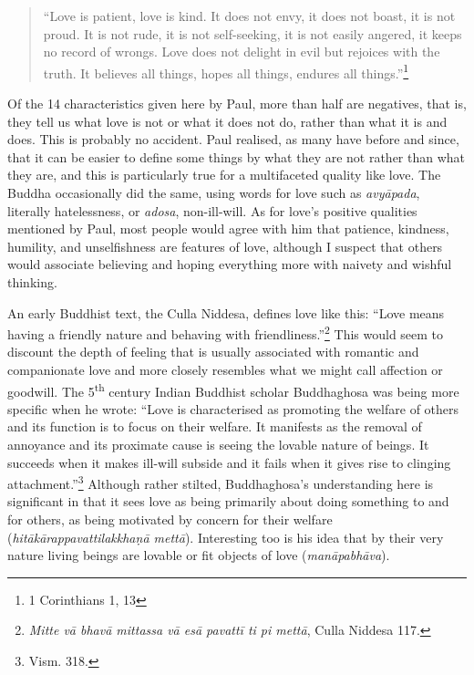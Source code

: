 \documentclass[10pt, openright]{book}
\begin{document}
\begin{quote}


“Love is patient, love is kind. It does not envy, it does not boast, it is not proud. It is not rude, it is not self-seeking, it is not easily angered, it keeps no record of wrongs. Love does not delight in evil but rejoices with the truth. It believes all things, hopes all things, endures all things.”\footnote {1 Corinthians 1, 13}




\end{quote}
Of the 14 characteristics given here by Paul, more than half are negatives, that is, they tell us what love is not or what it does not do, rather than what it is and does. This is probably no accident. Paul realised, as many have before and since, that it can be easier to define some things by what they are not rather than what they are, and this is particularly true for a multifaceted quality like love. The Buddha occasionally did the same, using words for love such as \textit{avyāpada}, literally hatelessness, or \textit{adosa}, non-ill-will. As for love’s positive qualities mentioned by Paul, most people would agree with him that patience, kindness, humility, and unselfishness are features of love, although I suspect that others would associate believing and hoping everything more with naivety and wishful thinking.


An early Buddhist text, the Culla Niddesa, defines love like this: “Love means having a friendly nature and behaving with friendliness.”\footnote {\textit{Mitte vā bhavā mittassa vā esā pavattī ti pi mettā}, Culla Niddesa 117.} This would seem to discount the depth of feeling that is usually associated with romantic and companionate love and more closely resembles what we might call affection or goodwill. The 5\textsuperscript{th} century Indian Buddhist scholar Buddhaghosa was being more specific when he wrote: “Love is characterised as promoting the welfare of others and its function is to focus on their welfare. It manifests as the removal of annoyance and its proximate cause is seeing the lovable nature of beings. It succeeds when it makes ill-will subside and it fails when it gives rise to clinging attachment.”\footnote {Vism. 318.} Although rather stilted, Buddhaghosa’s understanding here is significant in that it sees love as being primarily about doing something to and for others, as being motivated by concern for their welfare (\textit{hitākārappavattilakkhaṇā mettā}). Interesting too is his idea that by their very nature living beings are lovable or fit objects of love (\textit{manāpabhāva}).
\end{document}
